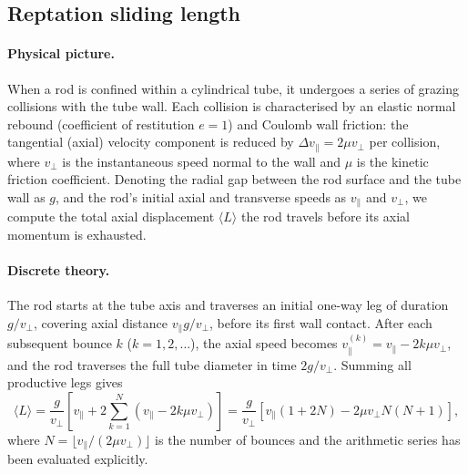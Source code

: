 
\subsection*{Reptation sliding length}

\paragraph{Physical picture.}
When a rod is confined within a cylindrical tube, it undergoes a series of
grazing collisions with the tube wall.  Each collision is characterised by an
elastic normal rebound (coefficient of restitution $e=1$) and Coulomb wall
friction: the tangential (axial) velocity component is reduced by
$\Delta v_{\parallel} = 2\mu v_{\perp}$ per collision, where $v_{\perp}$ is
the instantaneous speed normal to the wall and $\mu$ is the kinetic friction
coefficient.  Denoting the radial gap between the rod surface and the tube wall
as $g$, and the rod's initial axial and transverse speeds as $v_{\parallel}$
and $v_{\perp}$, we compute the total axial displacement $\langle L \rangle$
the rod travels before its axial momentum is exhausted.

\paragraph{Discrete theory.}
The rod starts at the tube axis and traverses an initial one-way leg of
duration $g/v_{\perp}$, covering axial distance $v_{\parallel}g/v_{\perp}$,
before its first wall contact.  After each subsequent bounce $k$
($k=1,2,\ldots$), the axial speed becomes
$v_{\parallel}^{(k)} = v_{\parallel} - 2k\mu v_{\perp}$, and the rod
traverses the full tube diameter in time $2g/v_{\perp}$.  Summing all
productive legs gives
%
\begin{equation}
  \langle L \rangle
  = \frac{g}{v_{\perp}}
    \!\left[
      v_{\parallel}
      + 2\sum_{k=1}^{N}\!\left(v_{\parallel} - 2k\mu v_{\perp}\right)
    \right]
  = \frac{g}{v_{\perp}}
    \!\left[
      v_{\parallel}(1+2N) - 2\mu v_{\perp} N(N+1)
    \right],
  \label{eq:reptation_L}
\end{equation}
%
where $N = \lfloor v_{\parallel}/(2\mu v_{\perp})\rfloor$ is the number of
bounces and the arithmetic series has been evaluated explicitly.

